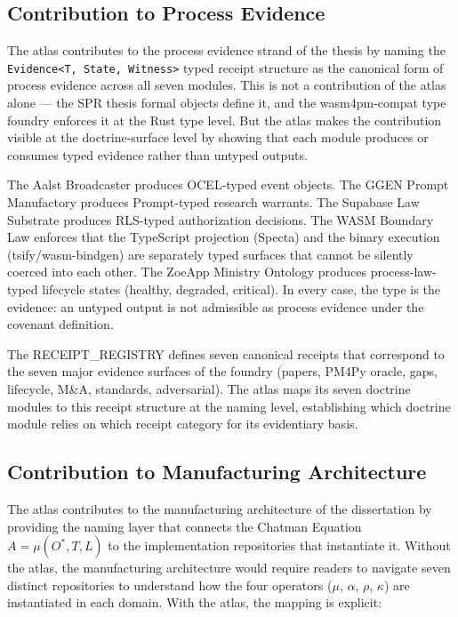 \subsection{Contribution to Process Evidence}
\label{sec:atlas-contribution-evidence}

The atlas contributes to the process evidence strand of the thesis by naming the
\texttt{Evidence<T, State, Witness>} typed receipt structure as the canonical
form of process evidence across all seven modules. This is not a contribution of
the atlas alone --- the SPR thesis formal objects define it, and the
wasm4pm-compat type foundry enforces it at the Rust type level. But the atlas
makes the contribution visible at the doctrine-surface level by showing that
each module produces or consumes typed evidence rather than untyped outputs.

The Aalst Broadcaster produces OCEL-typed event objects. The GGEN Prompt
Manufactory produces Prompt-typed research warrants. The Supabase Law Substrate
produces RLS-typed authorization decisions. The WASM Boundary Law enforces that
the TypeScript projection (Specta) and the binary execution (tsify/wasm-bindgen)
are separately typed surfaces that cannot be silently coerced into each other.
The ZoeApp Ministry Ontology produces process-law-typed lifecycle states
(healthy, degraded, critical). In every case, the type is the evidence: an
untyped output is not admissible as process evidence under the covenant
definition.

The RECEIPT\_REGISTRY defines seven canonical receipts that correspond to the
seven major evidence surfaces of the foundry (papers, PM4Py oracle, gaps,
lifecycle, M\&A, standards, adversarial). The atlas maps its seven doctrine
modules to this receipt structure at the naming level, establishing which
doctrine module relies on which receipt category for its evidentiary basis.

\subsection{Contribution to Manufacturing Architecture}
\label{sec:atlas-contribution-manufacturing}

The atlas contributes to the manufacturing architecture of the dissertation by
providing the naming layer that connects the Chatman Equation
$A = \mu(O^*, T, L)$ to the implementation repositories that instantiate it.
Without the atlas, the manufacturing architecture would require readers to
navigate seven distinct repositories to understand how the four operators
($\mu$, $\alpha$, $\rho$, $\kappa$) are instantiated in each domain. With the
atlas, the mapping is explicit:

